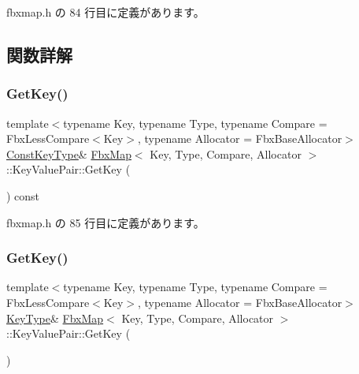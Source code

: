  fbxmap.\+h の 84 行目に定義があります。



\subsection{関数詳解}
\mbox{\label{class_fbx_map_1_1_key_value_pair_a6e43d1f01dc25d31294138c4c60b3b11}} 
\subsubsection{\texorpdfstring{Get\+Key()}{GetKey()}\hspace{0.1cm}{\footnotesize\ttfamily [1/2]}}
{\footnotesize\ttfamily template$<$typename Key, typename Type, typename Compare = Fbx\+Less\+Compare$<$\+Key$>$, typename Allocator = Fbx\+Base\+Allocator$>$ \\
\hyperlink{class_fbx_map_1_1_key_value_pair_a74738485dc0b74e76e09dfbcdca9e62e}{Const\+Key\+Type}\& \hyperlink{class_fbx_map}{Fbx\+Map}$<$ Key, Type, Compare, Allocator $>$\+::Key\+Value\+Pair\+::\+Get\+Key (\begin{DoxyParamCaption}{ }\end{DoxyParamCaption}) const\hspace{0.3cm}{\ttfamily [inline]}}



 fbxmap.\+h の 85 行目に定義があります。

\mbox{\label{class_fbx_map_1_1_key_value_pair_a68e18fe165bce40f21e0e18eef92978c}} 
\subsubsection{\texorpdfstring{Get\+Key()}{GetKey()}\hspace{0.1cm}{\footnotesize\ttfamily [2/2]}}
{\footnotesize\ttfamily template$<$typename Key, typename Type, typename Compare = Fbx\+Less\+Compare$<$\+Key$>$, typename Allocator = Fbx\+Base\+Allocator$>$ \\
\hyperlink{class_fbx_map_1_1_key_value_pair_a5e685c6ff77cdf31f878e5105737c1a3}{Key\+Type}\& \hyperlink{class_fbx_map}{Fbx\+Map}$<$ Key, Type, Compare, Allocator $>$\+::Key\+Value\+Pair\+::\+Get\+Key (\begin{DoxyParamCaption}{ }\end{DoxyParamCaption})\hspace{0.3cm}{\ttfamily [inline]}}



